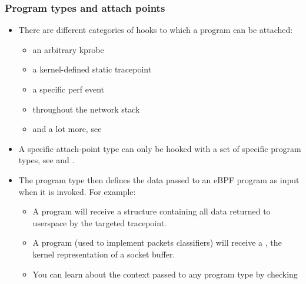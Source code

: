 \begin{frame}[fragile]
  \frametitle{Program types and attach points}
  \begin{itemize}
    \item There are different categories of hooks to which a program can be
    attached:
    \begin{itemize}
      \item an arbitrary kprobe
      \item a kernel-defined static tracepoint
      \item a specific perf event
      \item throughout the network stack
      \item and a lot more, see 
    \end{itemize}
    \item A specific attach-point type can only be hooked with a set of
    specific program types, see  and
    .
    \item The program type then defines the data passed to an eBPF program as
    input when it is invoked. For example:
    \begin{itemize}
      \item A  program will receive a structure
      containing all data returned to userspace by the targeted tracepoint.
      \item A  program (used to implement packets
      classifiers) will receive a , the kernel
      representation of a socket buffer.
      \item You can learn about the context passed to any program type by
      checking 
    \end{itemize}
  \end{itemize}
\end{frame}

